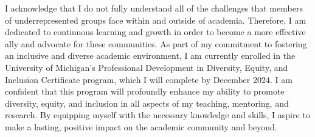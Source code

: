 \documentclass[11pt]{article}
\begin{document}

I acknowledge that I do not fully understand all of the challenges that members of underrepresented groups face within and outside of academia.
Therefore, I am dedicated to continuous learning and growth in order to become a more effective ally and advocate for these communities.
As part of my commitment to fostering an inclusive and diverse academic environment, I am currently enrolled in the University of Michigan's Professional Development in Diversity, Equity, and Inclusion Certificate program, which I will complete by December 2024.
I am confident that this program will profoundly enhance my ability to promote diversity, equity, and inclusion in all aspects of my teaching, mentoring, and research.
By equipping myself with the necessary knowledge and skills, I aspire to make a lasting, positive impact on the academic community and beyond.
\end{document}
